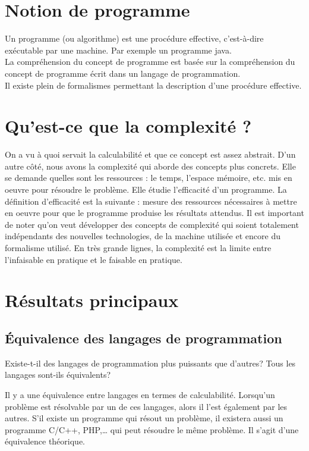 \section{Notion de programme}
\label{sec:notion_de_programme}

Un programme (ou algorithme) est une \og procédure effective\fg, c'est-à-dire exécutable par une machine. Par exemple un programme java.\\

La compréhension du concept de programme est basée sur la compréhension du concept de \og programme écrit dans un langage de programmation\fg.\\

Il existe plein de formalismes permettant la description d'une \og procédure effective\fg.

\section{Qu'est-ce que la complexité ?}
On a vu à quoi servait la calculabilité et que ce concept est assez abstrait. D'un autre côté, nous avons la complexité qui aborde des concepts plus concrets. Elle se demande quelles sont les ressources : le temps, l'espace mémoire, etc. mis en oeuvre pour résoudre le problème.
Elle étudie l'efficacité d'un programme. La définition d'efficacité est la suivante : mesure des ressources nécessaires à mettre en oeuvre pour que le programme produise les résultats attendus.
Il est important de noter qu'on veut développer des concepts de complexité qui soient totalement indépendants des nouvelles technologies, de la machine utilisée et encore du formalisme utilisé.
En très grande lignes, la complexité est la limite entre l'infaisable en pratique et le faisable en pratique. 


\section{Résultats principaux}
\label{sec:r_sultat_principaux}

\subsection{Équivalence des langages de programmation}
\label{subsec:equivalence_des_langages_de_programmation}

Existe-t-il des langages de programmation plus puissants que d'autres? Tous les langages sont-ils équivalents?

Il y a une équivalence entre langages en termes de calculabilité.  Lorsqu'un problème est résolvable par un de ces langages, alors il l'est également par les autres.
S'il existe un programme \java qui résout un problème, il existera aussi un programme C/C++, PHP,\ldots{} qui peut résoudre le même problème. Il s'agit d'une équivalence théorique.


